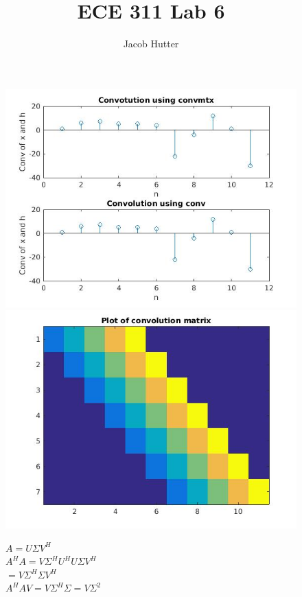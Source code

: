 \documentclass{article}
\author{Jacob Hutter}
\title{ECE 311 Lab 6}
\begin{document}
\maketitle

\begin{figure}[H]

\includegraphics[scale=.5]{report1_1}
\includegraphics[scale=.5]{report1_2}
\end{figure}

\begin{figure}[H]
$A = U \Sigma V^H $
\\$A^HA = V\Sigma^HU^HU \Sigma V^H $
\\$= V \Sigma^H \Sigma V^H$
\\ $A^HAV= V \Sigma^H \Sigma = V \Sigma^2$
\end{figure}
\end{document}
